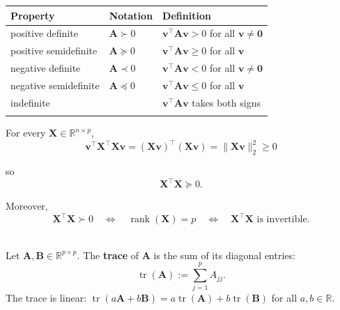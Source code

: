 \begin{table}[H]
\centering
\begin{tabular}{lll}
\toprule
\textbf{Property} & \textbf{Notation} & \textbf{Definition} \\
\midrule
positive definite & $\bm{A} \succ  0$ & $\bm{v}^\top \bm{A}\bm{v} > 0$ for all $\bm{v} \neq \bm{0}$ \\
positive semidefinite & $\bm{A} \succeq 0$ & $\bm{v}^\top \bm{A}\bm{v} \geq 0$ for all $\bm{v}$ \\
negative definite & $\bm{A} \prec 0$ & $\bm{v}^\top \bm{A}\bm{v} < 0$ for all $\bm{v} \neq \bm{0}$ \\
negative semidefinite & $\bm{A} \preceq 0$ & $\bm{v}^\top \bm{A}\bm{v} \leq 0$ for all $\bm{v}$ \\
indefinite & & $\bm{v}^\top \bm{A}\bm{v}$ takes both signs\\
\botrule
\end{tabular}
\end{table}

For every $\bm{X} \in \mathbb{R}^{n \times p}$,
\begin{equation*}
    \bm{v}^\top \bm{X}^\top \bm{X}\bm{v} = (\bm{X}\bm{v})^\top (\bm{X}\bm{v}) = \lVert \bm{X}\bm{v} \rVert_2^2 \geq 0
\end{equation*}

so
\begin{equation*}
    \bm{X}^\top \bm{X} \succeq 0.
\end{equation*}

Moreover,
\begin{equation*}
    \bm{X}^\top \bm{X} \succ 0 \quad \Longleftrightarrow \quad \operatorname{rank}(\bm{X}) = p \quad \Longleftrightarrow \quad \bm{X}^\top \bm{X} \text{ is invertible.}
\end{equation*}

\begin{definition}[Trace]\leavevmode\\
    Let $\bm{A}, \bm{B} \in \mathbb{R}^{p \times p}$. The \textbf{trace} of $\bm{A}$ is the sum of its diagonal entries:
    \begin{equation*}
        \operatorname{tr}(\bm{A}) := \sum_{j=1}^p A_{jj}.
    \end{equation*}
    The trace is linear: $\operatorname{tr}(a\bm{A} + b\bm{B}) = a \operatorname{tr}(\bm{A}) + b \operatorname{tr}(\bm{B})$ for all $a, b \in \mathbb{R}$.
\end{definition}

